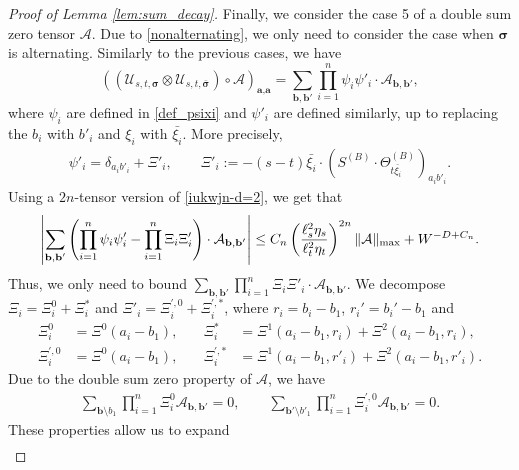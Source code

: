 \begin{proof}[Proof of Lemma \ref{lem:sum_decay}]
{}
Finally, we consider the case 5 of a double sum zero tensor $\mathcal{A}$. Due to \eqref{nonalternating}, we only need to consider the case when $\boldsymbol{\sigma}$ is alternating. Similarly to the previous cases, we have 
\begin{equation*}
    \left(\left(\mathcal{U}_{s,t,\boldsymbol{\sigma}}\otimes \mathcal{U}_{s,t,\boldsymbol{\bar{\sigma}}}\right) \circ \mathcal{A}\right)_{\textbf{a},\textbf{a}} = \sum_{\textbf{b}, \textbf{b}'} \prod_{i=1}^n \psi_i \psi'_i \cdot \mathcal{A}_{\textbf{b},\textbf{b}'},
\end{equation*}
where $\psi_i$ are defined in \eqref{def_psixi} and $\psi'_i$ are defined similarly, up to replacing the $b_i$ with $b'_i$ and $\xi_i$ with $\bar{\xi_i}$. More precisely,
\begin{align}\label{def_psixi_prime}
     \psi'_i=\delta_{a_ib'_i}+\Xi'_i,  \quad \quad 
\Xi'_i:=-(s-t)\bar{\xi_i} \cdot \left(S^{(B)}\cdot \Theta^{(B)}_{t \bar{\xi_i}}\right)_{a_ib'_i}.
\end{align} 
Using a $2n$-tensor version of \eqref{iukwjn-d=2}, we get that
\begin{align*}
    \left|\sum_{\textbf{b}, \textbf{b}'} \left(\prod_{i=1}^n \psi_i \psi'_i-\prod_{i=1}^n\Xi_i\Xi'_i\right) \cdot \mathcal{A}_{\textbf{b},\textbf{b}'}\right| \le C_n \left(\frac{\ell_{s}^{2}\eta_{s}}{\ell_{t}^{2}\eta_{t}}\right)^{2n}\|{\cal A}\|_{\max}+W^{-D+C_{n}}.
\end{align*}
%
Thus, we only need to bound $\sum_{\textbf{b}, \textbf{b}'} \prod_{i=1}^n \Xi_i\Xi'_i \cdot \mathcal{A}_{\textbf{b},\textbf{b}'}$. We decompose $\Xi_i = \Xi_i^0 + \Xi_i^\ast$ and $\Xi'_i =  \Xi_i^{\prime,0} + \Xi_i^{\prime,\ast}$, where $r_i = b_i - b_1$, $r_i' = b_i' - b_1$ and
\begin{align*}
    \Xi_i^0 &= \Xi^0(a_i - b_1), \quad &\Xi^\ast_i &= \Xi^1(a_i - b_1, r_i) + \Xi^2(a_i - b_1, r_i),\\
    \Xi_i^{\prime,0} &= \Xi^0(a_i - b_1), \quad &\Xi^{\prime,\ast}_i &= \Xi^1(a_i - b_1, r'_i) + \Xi^2(a_i - b_1, r'_i).
\end{align*}
%
Due to the double sum zero property of $\mathcal{A}$, we have
\begin{align*}
    \sum_{\textbf{b}\setminus b_1} \prod_{i=1}^n \Xi_i^0 \mathcal{A}_{\textbf{b},\textbf{b}'} = 0, \qquad \sum_{\textbf{b}'\setminus b'_1} \prod_{i=1}^n \Xi_i^{\prime,0} \mathcal{A}_{\textbf{b},\textbf{b}'} = 0.
\end{align*}
These properties allow us to expand
\begin{align*}

\end{align*}
\end{proof}
